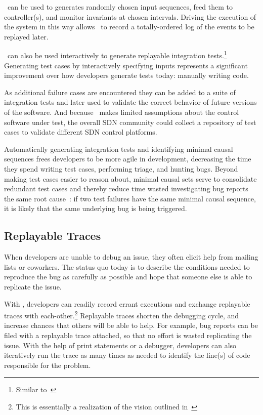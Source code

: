 \projectname~can be used to generates randomly chosen input
sequences, feed them to controller(s), and monitor invariants at chosen
intervals. Driving the
execution of the system in this way allows \projectname~to record a
totally-ordered log of the events to be replayed later.

\projectname~can also be used interactively to generate replayable integration
tests.\footnote{Similar to~\cite{automated_tests}} Generating test cases by
interactively specifying inputs represents a
significant improvement over how developers generate tests today: manually writing
code.

As additional failure cases are encountered they can be added
to a suite of integration tests and later used to validate the correct
behavior of future versions of the software. And because \projectname~makes
limited assumptions about the control software under test, the overall SDN community
could collect a repository of test cases to validate different SDN control platforms.

Automatically generating integration tests and identifying
minimal causal sequences frees developers to be more agile in
development, decreasing the time they spend writing test cases,
performing triage, and
hunting bugs. Beyond making test cases easier to reason about, minimal causal
sets serve to consolidate redundant test cases and thereby reduce time wasted
investigating bug reports the same root
cause~\cite{Zeller:2002:SIF:506201.506206}:
if two test failures have the same minimal causal sequence, it is
likely that the same underlying bug is being triggered.

\subsection{Replayable Traces}

When developers are unable to debug an issue, they often elicit help from
mailing lists or coworkers. The status quo today is to describe the conditions needed to
reproduce the bug as carefully as possible and hope that someone else is able
to replicate the issue.

With \projectname, developers can readily record errant executions and
exchange replayable traces with each-other.\footnote{This is essentially a
realization of the vision outlined in~\cite{lin2009towards}} Replayable traces shorten the debugging cycle, and increase chances that others
will be able to help. For example, bug reports can be filed with a replayable trace
attached, so that no
effort is wasted replicating the issue. With the help of print statements or a
debugger, developers can also iteratively run the trace as many times as
needed to identify the line(s) of code responsible for the problem.

